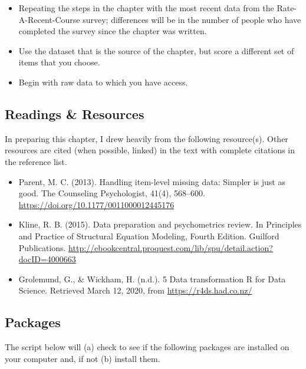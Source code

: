 \documentclass[
  english,
]{book}
\providecommand{\tightlist}{%
  \setlength{\itemsep}{0pt}\setlength{\parskip}{0pt}}
\begin{document}
\begin{itemize}
\tightlist
\item
  Repeating the steps in the chapter with the most recent data from the Rate-A-Recent-Course survey; differences will be in the number of people who have completed the survey since the chapter was written.
\item
  Use the dataset that is the source of the chapter, but score a different set of items that you choose.
\item
  Begin with raw data to which you have access.
\end{itemize}

\hypertarget{readings-resources-1}{%
\subsection{Readings \& Resources}\label{readings-resources-1}}

In preparing this chapter, I drew heavily from the following resource(s). Other resources are cited (when possible, linked) in the text with complete citations in the reference list.

\begin{itemize}
\item
  Parent, M. C. (2013). Handling item-level missing data: Simpler is just as good. The Counseling Psychologist, 41(4), 568--600. \url{https://doi.org/10.1177/0011000012445176}
\item
  Kline, R. B. (2015). Data preparation and psychometrics review. In Principles and Practice of Structural Equation Modeling, Fourth Edition. Guilford Publications. \url{http://ebookcentral.proquest.com/lib/spu/detail.action?docID=4000663}
\item
  Grolemund, G., \& Wickham, H. (n.d.). 5 Data transformation \textbar{} R for Data Science. Retrieved March 12, 2020, from \url{https://r4ds.had.co.nz/}
\end{itemize}

\hypertarget{packages-2}{%
\subsection{Packages}\label{packages-2}}

The script below will (a) check to see if the following packages are installed on your computer and, if not (b) install them.
\end{document}
